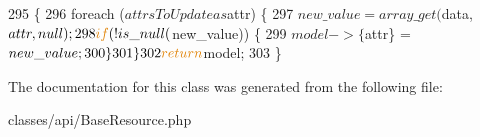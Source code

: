 \begin{DoxyCode}
295     \{
296         \textcolor{keywordflow}{foreach} ($attrsToUpdate as $attr) \{
297             $new\_value = array\_get($data, $attr, null);
298             \textcolor{keywordflow}{if}(!is\_null($new\_value)) \{
299                 $model->\{$attr\} = $new\_value;
300             \}
301         \}
302         \textcolor{keywordflow}{return} $model;
303     \}
\end{DoxyCode}


The documentation for this class was generated from the following file\+:\begin{DoxyCompactItemize}
\item 
classes/api/Base\+Resource.\+php\end{DoxyCompactItemize}
